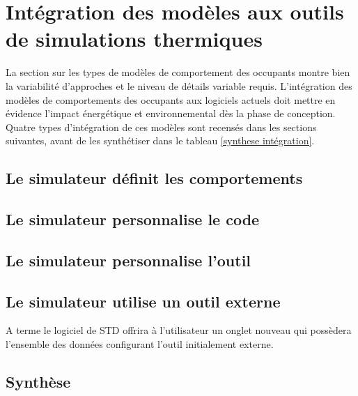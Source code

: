 \section{Intégration des modèles aux outils de simulations thermiques}

La section sur les types de modèles de comportement des occupants montre bien la variabilité d'approches et le niveau de détails variable requis. L'intégration des modèles de comportements des occupants aux logiciels actuels doit mettre en évidence l'impact énergétique et environnemental dès la phase de conception. Quatre types d'intégration de ces modèles sont recensés dans les sections suivantes, avant de les synthétiser dans le tableau \ref{synthese intégration}.

\subsection{Le simulateur définit les comportements}

\subsection{Le simulateur personnalise le code}

\subsection{Le simulateur personnalise l'outil}

\subsection{Le simulateur utilise un outil externe}

A terme le logiciel de STD offrira à l'utilisateur un onglet nouveau qui possèdera l'ensemble des données configurant l'outil initialement externe.

\subsection{Synthèse}

